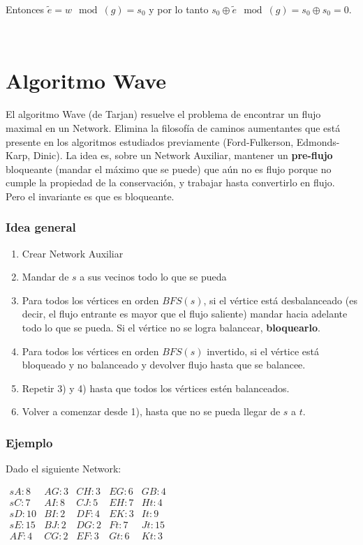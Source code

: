 \documentclass[10pt,a4paper]{article}
\begin{document}
Entonces $\tilde e = w \mod (g) = s_0$ y por lo tanto $s_0 \oplus \tilde e \mod (g) = s_0 \oplus s_0 = 0$.

 

\section*{Algoritmo Wave}

El algoritmo Wave (de Tarjan) resuelve el problema de encontrar un flujo maximal en un Network. Elimina la filosofía de caminos aumentantes que está presente en los algoritmos estudiados previamente (Ford-Fulkerson, Edmonds-Karp, Dinic). La idea es, sobre un Network Auxiliar, mantener un \textbf{pre-flujo} bloqueante (mandar el máximo que se puede) que aún no es flujo porque no cumple la propiedad de la conservación, y trabajar hasta convertirlo en flujo. Pero el invariante es que es bloqueante.

\subsubsection*{Idea general}

\begin{enumerate}

	\item Crear Network Auxiliar
	\item Mandar de $s$ a sus vecinos todo lo que se pueda
	\item Para todos los vértices en orden $BFS(s)$, si el vértice está desbalanceado (es decir, el flujo entrante es mayor que el flujo saliente) mandar hacia adelante todo lo que se pueda. Si el vértice no se logra balancear, \textbf{bloquearlo}.
	\item Para todos los vértices en orden $BFS(s)$ invertido, si el vértice está bloqueado y no balanceado y devolver flujo hasta que se balancee.
	\item Repetir 3) y 4) hasta que todos los vértices estén balanceados.
	\item Volver a comenzar desde 1), hasta que no se pueda llegar de $s$ a $t$.
\end{enumerate}

\subsubsection*{Ejemplo}

Dado el siguiente Network:

\begin{center}
$\begin{array}{lllll} sA:8 & AG: 3 & CH: 3 & EG: 6 & GB:4\\ sC:7 & AI: 8 & CJ: 5 & EH: 7 & Ht: 4\\ sD:10 & BI: 2 & DF:4 & EK: 3 & It: 9\\ sE: 15 &BJ: 2 & DG: 2 & Ft: 7 & Jt: 15\\ AF: 4 & CG: 2 & EF: 3 & Gt: 6 & Kt: 3\\ \end{array}$
\end{center}
\end{document}
